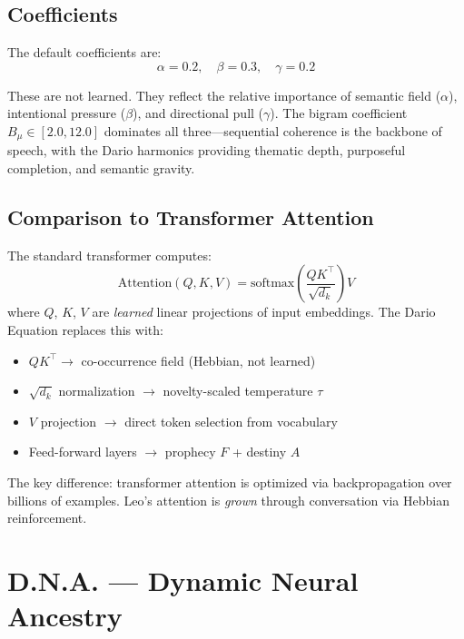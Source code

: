 \documentclass[11pt,twocolumn]{article}
\begin{document}
\subsection{Coefficients}

The default coefficients are:
\begin{equation}
  \alpha = 0.2, \quad \beta = 0.3, \quad \gamma = 0.2
\end{equation}

These are not learned. They reflect the relative importance of semantic field ($\alpha$), intentional pressure ($\beta$), and directional pull ($\gamma$). The bigram coefficient $B_\mu \in [2.0, 12.0]$ dominates all three---sequential coherence is the backbone of speech, with the Dario harmonics providing thematic depth, purposeful completion, and semantic gravity.

\subsection{Comparison to Transformer Attention}

The standard transformer computes:
\begin{equation}
  \text{Attention}(Q, K, V) = \text{softmax}\!\left(\frac{QK^\top}{\sqrt{d_k}}\right) V
\end{equation}
where $Q$, $K$, $V$ are \textit{learned} linear projections of input embeddings. The Dario Equation replaces this with:

\begin{itemize}
  \item $QK^\top \rightarrow$ co-occurrence field (Hebbian, not learned)
  \item $\sqrt{d_k}$ normalization $\rightarrow$ novelty-scaled temperature $\tau$
  \item $V$ projection $\rightarrow$ direct token selection from vocabulary
  \item Feed-forward layers $\rightarrow$ prophecy $F$ + destiny $A$
\end{itemize}

The key difference: transformer attention is optimized via backpropagation over billions of examples. Leo's attention is \textit{grown} through conversation via Hebbian reinforcement.

\section{D.N.A. --- Dynamic Neural Ancestry}
\label{sec:dna}
\end{document}
